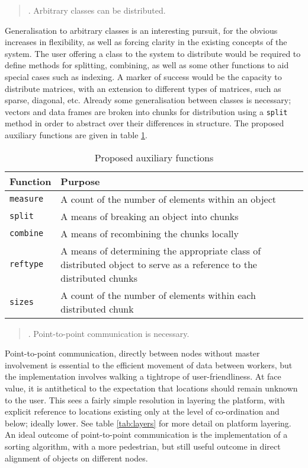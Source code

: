 \documentclass[10pt, a4paper]{article}
\newcounter{assumption}[section]
\newcommand{\assume}[1]{\begin{quote}
\centering
\stepcounter{assumption}
\arabic{assumption}. {#1}
\end{quote}}
\begin{document}
\assume{Arbitrary classes can be distributed.}
Generalisation to arbitrary classes is an interesting pursuit, for the obvious
increases in flexibility, as well as forcing clarity in the existing concepts
of the system.
The user offering a class to the system to distribute would be required to
define methods for splitting, combining, as well as some other functions to aid
special cases such as indexing.
A marker of success would be the capacity to distribute matrices, with an
extension to different types of matrices, such as sparse, diagonal, etc.
Already some generalisation between classes is necessary;
vectors and data frames are broken into chunks for distribution using a
\texttt{split} method in order to abstract over their differences in structure.
The proposed auxiliary functions are given in table \ref{tab:aux}.

\begin{table}
	\centering
	\begin{tabularx}{\textwidth}{ l X }
		\toprule
		Function		& Purpose \\
		\midrule
		\texttt{measure} 	& A count of the number of elements 
					  within an object\\
		\texttt{split} 		& A means of breaking an object into
					  chunks\\
		\texttt{combine} 	& A means of recombining the chunks
					  locally\\
		\texttt{reftype} 	& A means of determining the 
					  appropriate class of distributed 
					  object to serve as a reference to the
					  distributed chunks \\
		\texttt{sizes} 		& A count of the number of elements 
					  within each distributed chunk\\
	\end{tabularx}
	\caption{Proposed auxiliary functions}
	\label{tab:aux}
\end{table}
			

\assume{Point-to-point communication is necessary.}
Point-to-point communication, directly between nodes without master involvement
is essential to the efficient movement of data between workers, but the
implementation involves walking a tightrope of user-friendliness.
At face value, it is antithetical to the expectation that locations should
remain unknown to the user. 
This sees a fairly simple resolution in layering the platform, with explicit
reference to locations existing only at the level of co-ordination and below;
ideally lower.
See table \ref{tab:layers} for more detail on platform layering.
An ideal outcome of point-to-point communication is the implementation of a
sorting algorithm, with a more pedestrian, but still useful outcome in direct
alignment of objects on different nodes.
\end{document}

